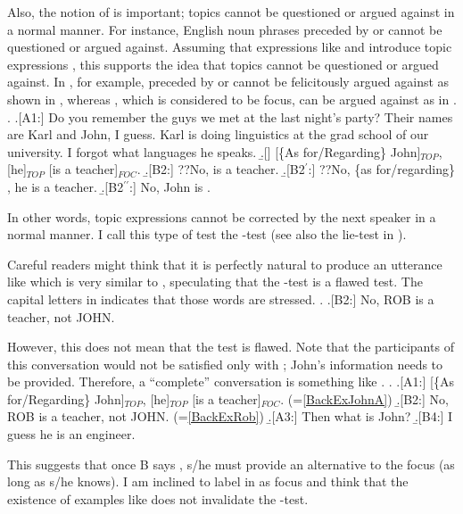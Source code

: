 Also, the notion of  is important;
topics cannot be questioned or argued against in a normal manner.
For instance,
English noun phrases preceded by  or  cannot be questioned or argued against.
Assuming that expressions like  and  introduce topic expressions \cite{kuno72,kuno76,gundel74},
this supports the idea that topics cannot be questioned or argued against.
In \Next, for example,
 preceded by  or  cannot be felicitously argued against as shown in \Next[B2,B2$^{\prime}$],
whereas , which is considered to be focus,
can be argued against as in .
%
\ex. \label{BackExJohn}\a.[A1:] Do you remember the guys we met at the last night's party?\label{BackExJohnA}
     Their names are Karl and John, I guess.
     Karl is doing linguistics at the grad school of our university.
     I forgot what languages he speaks.
     \b.[] [\{As for/Regarding\} John]$_{TOP}$, [he]$_{TOP}$ [is a teacher]$_{FOC}$.
     \b.[B2:] ??No,  is a teacher.
     \b.[B2$^{\prime}$:] ??No, \{as for/regarding\} , he is a teacher.
     \b.[B2$^{\prime\prime}$:] No, John is .

In other words, topic expressions cannot be corrected by the next speaker in a normal manner.
I call this type of test the -test
 (see also the lie-test in ).

Careful readers might think that it is perfectly natural to produce an utterance like \Next which is very similar to \Last[B2],
speculating that the -test is a flawed test.
The capital letters in \Next indicates that
those words are stressed.
%
\ex. \a.[B2:]\label{BackExRob} No, {ROB} is a teacher, not JOHN.

However, this does not mean that the test is flawed.
Note that the participants of this conversation would not be satisfied only with \Last;
John's information needs to be provided.
Therefore, a ``complete'' conversation is something like \Next.
%
\ex. \a.[A1:] [\{As for/Regarding\} John]$_{TOP}$, [he]$_{TOP}$ [is a teacher]$_{FOC}$. \hfill{(=\ref{BackExJohnA})}
     \b.[B2:] No, {ROB} is a teacher, not JOHN. \hfill{(=\ref{BackExRob})}
     \b.[A3:] Then what is John?
     \b.[B4:] I guess he is an engineer.

This suggests that
once B says , s/he must provide an alternative to the focus (as long as s/he knows).
I am inclined to label  in \Last[B2] as focus
and think that the existence of examples like \LLast[B] does not invalidate the -test.

